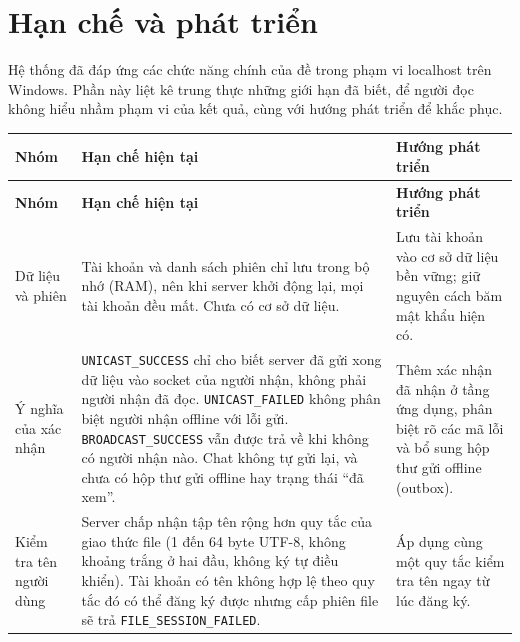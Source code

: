 \section{Hạn chế và phát triển}
Hệ thống đã đáp ứng các chức năng chính của đề trong phạm vi localhost trên Windows. Phần này liệt kê trung thực những giới hạn đã biết, để người đọc không hiểu nhầm phạm vi của kết quả, cùng với hướng phát triển để khắc phục.



\begingroup
\small
\renewcommand{\arraystretch}{1.4}

\begin{xltabular}{\textwidth}{
    @{}
    >{\raggedright\arraybackslash}p{2.6cm}
    >{\raggedright\arraybackslash}X
    >{\raggedright\arraybackslash}X
    @{}
}
    \toprule
    \textbf{Nhóm} & \textbf{Hạn chế hiện tại} & \textbf{Hướng phát triển} \\
    \midrule
    \endfirsthead

    \toprule
    \textbf{Nhóm} & \textbf{Hạn chế hiện tại} & \textbf{Hướng phát triển} \\
    \midrule
    \endhead

    \bottomrule
    \endfoot

    Dữ liệu và phiên
    & Tài khoản và danh sách phiên chỉ lưu trong bộ nhớ (RAM), nên khi server khởi động lại, mọi tài khoản đều mất. Chưa có cơ sở dữ liệu.
    & Lưu tài khoản vào cơ sở dữ liệu bền vững; giữ nguyên cách băm mật khẩu hiện có. \\

    \addlinespace

    Ý nghĩa của xác nhận
    & \texttt{UNICAST\_SUCCESS} chỉ cho biết server đã gửi xong dữ liệu vào socket của người nhận, không phải người nhận đã đọc. \texttt{UNICAST\_FAILED} không phân biệt người nhận offline với lỗi gửi. \texttt{BROADCAST\_SUCCESS} vẫn được trả về khi không có người nhận nào. Chat không tự gửi lại, và chưa có hộp thư gửi offline hay trạng thái ``đã xem''.
    & Thêm xác nhận đã nhận ở tầng ứng dụng, phân biệt rõ các mã lỗi và bổ sung hộp thư gửi offline (outbox). \\

    \addlinespace

    Kiểm tra tên người dùng
    & Server chấp nhận tập tên rộng hơn quy tắc của giao thức file (1 đến 64 byte UTF-8, không khoảng trắng ở hai đầu, không ký tự điều khiển). Tài khoản có tên không hợp lệ theo quy tắc đó có thể đăng ký được nhưng cấp phiên file sẽ trả \texttt{FILE\_SESSION\_FAILED}.
    & Áp dụng cùng một quy tắc kiểm tra tên ngay từ lúc đăng ký. \\


\end{xltabular}
